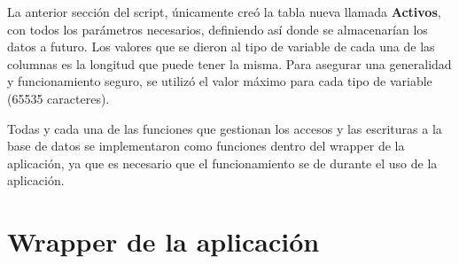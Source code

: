 La anterior sección del script, únicamente creó la tabla nueva llamada \textbf{Activos}, con todos los parámetros necesarios, definiendo así donde se almacenarían los datos a futuro. Los valores que se dieron al tipo de variable de cada una de las columnas es la longitud que puede tener la misma. Para asegurar una generalidad y funcionamiento seguro, se utilizó el valor máximo para cada tipo de variable (65535 caracteres).
\par
Todas y cada una de las funciones que gestionan los accesos y las escrituras a la base de datos se implementaron como funciones dentro del wrapper de la aplicación, ya que es necesario que el funcionamiento se de durante el uso de la aplicación. 




\section{Wrapper de la aplicación}